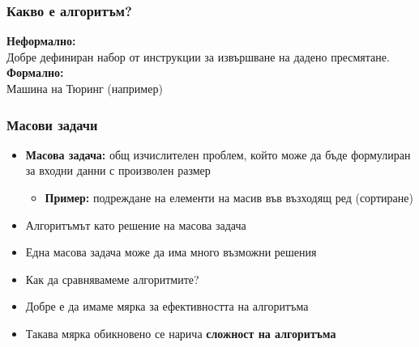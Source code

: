 \documentclass{beamer}
\begin{document}
\begin{frame}
  \frametitle{Какво е алгоритъм?}

  \pause
  \textbf{Неформално:}\\
  Добре дефиниран набор от инструкции за извършване на дадено пресмятане.\\[2em]
  \pause
  \textbf{Формално:}\\
  Машина на Тюринг (например)
\end{frame}

\begin{frame}
  \frametitle{Масови задачи}

  \begin{itemize}[<+->]
  \item \textbf{Масова задача:} общ изчислителен проблем, който може да бъде формулиран за входни данни с произволен размер
    \begin{itemize}
    \item \textbf{Пример:} подреждане на елементи на масив във възходящ ред (сортиране)
    \end{itemize}
  \item Алгоритъмът като решение на масова задача
  \item Една масова задача може да има много възможни решения
  \item \alert{Как да сравнявамеме алгоритмите?}
  \item Добре е да имаме мярка за ефективността на алгоритъма
  \item Такава мярка обикновено се нарича \textbf{сложност на алгоритъма}
  \end{itemize}
\end{frame}
\end{document}
